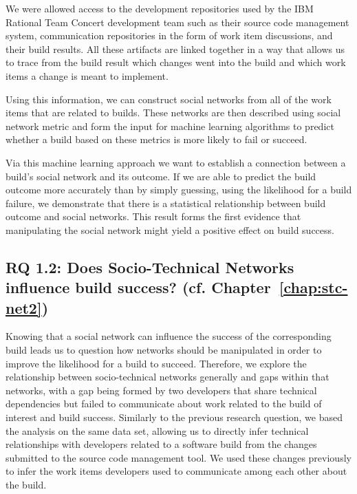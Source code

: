 We were allowed access to the development repositories used by the IBM Rational Team Concert development team such as their source code management system, communication repositories in the form of work item discussions, and their build results.
All these artifacts are linked together in a way that allows us to trace from the build result which changes went into the build and which work items a change is meant to implement.

Using this information, we can construct social networks from all of the work items that are related to builds.
These networks are then described using social network metric and form the input for machine learning algorithms to predict whether a build based on these metrics is more likely to fail or succeed.

Via this machine learning approach we want to establish a connection between a build's social network and its outcome. 
If we are able to predict the build outcome more accurately than by simply guessing, using the likelihood for a build failure, we demonstrate that there is a statistical relationship between build outcome and social networks.
This result forms the first evidence that manipulating the social network might yield a positive effect on build success.

\subsection{%
  RQ 1.2: Does Socio-Technical Networks influence build success? (cf. Chapter~\ref{chap:stc-net2})}

Knowing that a social network can influence the success of the corresponding build leads us to question how networks should be manipulated in order to improve the likelihood for a build to succeed.
Therefore, we explore the relationship between socio-technical networks generally and gaps within that networks, with a gap being formed by two developers that share technical dependencies but failed to communicate about work related to the build of interest and build success.
Similarly to the previous research question, we based the analysis on the same data set, allowing us to directly infer technical relationships with developers related to a software build from the changes submitted to the source code management tool.
We used these changes previously to infer the work items developers used to communicate among each other about the build.

